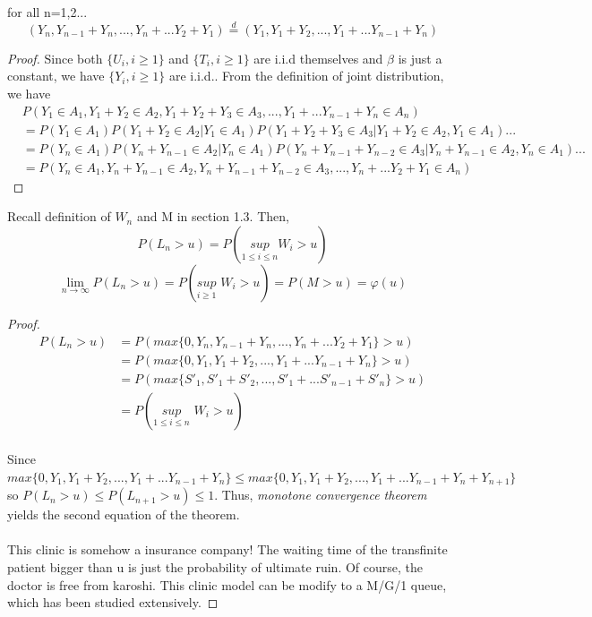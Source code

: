 \documentclass[project2.tex]{subfiles}
\begin{document}
\begin{lemma}for all n=1,2...
$$(Y_n,Y_{n-1}+Y_n,...,Y_n+...Y_2+Y_1)\overset{d}{=}(Y_1,Y_{1}+Y_2,...,Y_1+...Y_{n-1}+Y_n)$$
\end{lemma}
\begin{proof}Since both $\{U_i,i\geq 1\}$ and $\{T_i,i\geq 1\}$ are i.i.d themselves and $\beta$ is just a constant, we have $\{Y_i,i\geq 1\}$ are i.i.d.. From the definition of joint distribution, we have
\footnotesize{
\begin{align*}
&P(Y_1\in A_1,Y_1+Y_2\in A_2,Y_1+Y_2+Y_3\in A_3,...,Y_1+...Y_{n-1}+Y_n \in A_n)\\
&=P(Y_1\in A_1)P(Y_1+Y_2\in A_2|Y_1\in A_1)P(Y_1+Y_2+Y_3\in A_3|Y_1+Y_2\in A_2,Y_1\in A_1)...\\
&=P(Y_n\in A_1)P(Y_n+Y_{n-1}\in A_2|Y_n\in A_1)P(Y_n+Y_{n-1}+Y_{n-2}\in A_3|Y_n+Y_{n-1}\in A_2,Y_n\in A_1)...\\
&=P(Y_n\in A_1,Y_n+Y_{n-1}\in A_2,Y_n+Y_{n-1}+Y_{n-2}\in A_3,...,Y_n+...Y_2+Y_1 \in A_n)
\end{align*}
}
\end{proof}
\begin{theorem}
Recall definition of $W_n$ and M in section 1.3. Then, $$P(L_n>u)=P(\underset{1\leq i\leq n}{sup}W_i>u)$$ 
$$\lim_{n\rightarrow\infty}P(L_n>u)=P(\underset{i\geq1}{sup}\hspace{4pt} W_i>u)=P(M>u)=\varphi(u)$$  
\end{theorem}
\begin{proof}
\begin{align*}
P(L_n>u)&=P(max\{0,Y_n,Y_{n-1}+Y_n,...,Y_n+...Y_2+Y_1\}> u)\\
&=P(max\{0,Y_1,Y_1+Y_2,...,Y_1+...Y_{n-1}+Y_n\}>u)\\
&=P(max\{S'_1,S'_1+S'_2,...,S'_1+...S'_{n-1}+S'_n\}>u)\\
&=P(\underset{1\leq i\leq n}{sup}\hspace{4pt} W_i>u)
\end{align*}
\paragraph{}
Since $max\{0,Y_1,Y_1+Y_2,...,Y_1+...Y_{n-1}+Y_n\}\leq max\{0,Y_1,Y_1+Y_2,...,Y_1+...Y_{n-1}+Y_n+Y_{n+1}\}$ so $P(L_n>u)\leq P(L_{n+1}>u)\leq 1$. Thus, {\it monotone convergence theorem }yields the second equation of the theorem.
\paragraph{}
This clinic is somehow a insurance company! The waiting time of the transfinite patient bigger than u is just the probability of ultimate ruin. Of course, the doctor is free from karoshi. This clinic model can be modify to a M/G/1 queue, which has been studied extensively. 
\end{proof}     
\end{document}
